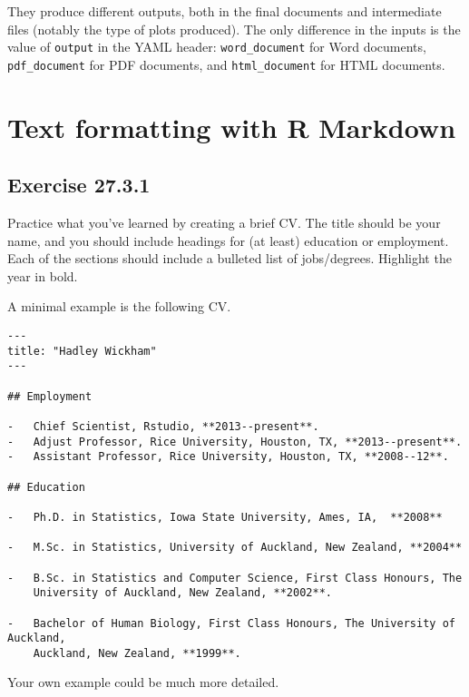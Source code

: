 \documentclass[]{book}
\theoremstyle{plain}
\theoremstyle{remark}
\begin{document}
They produce different outputs, both in the final documents and
intermediate files (notably the type of plots produced). The only
difference in the inputs is the value of \texttt{output} in the YAML
header: \texttt{word\_document} for Word documents,
\texttt{pdf\_document} for PDF documents, and \texttt{html\_document}
for HTML documents.

\hypertarget{text-formatting-with-r-markdown}{%
\section{Text formatting with R
Markdown}\label{text-formatting-with-r-markdown}}

\hypertarget{exercise-27.3.1}{%
\subsection*{\texorpdfstring{Exercise
{27.3.1}}{Exercise 27.3.1}}\label{exercise-27.3.1}}

Practice what you've learned by creating a brief CV. The title should be
your name, and you should include headings for (at least) education or
employment. Each of the sections should include a bulleted list of
jobs/degrees. Highlight the year in bold.

A minimal example is the following CV.

\begin{verbatim}
---
title: "Hadley Wickham"
---

## Employment

-   Chief Scientist, Rstudio, **2013--present**.
-   Adjust Professor, Rice University, Houston, TX, **2013--present**.
-   Assistant Professor, Rice University, Houston, TX, **2008--12**.

## Education

-   Ph.D. in Statistics, Iowa State University, Ames, IA,  **2008**

-   M.Sc. in Statistics, University of Auckland, New Zealand, **2004**

-   B.Sc. in Statistics and Computer Science, First Class Honours, The 
    University of Auckland, New Zealand, **2002**.

-   Bachelor of Human Biology, First Class Honours, The University of Auckland, 
    Auckland, New Zealand, **1999**.
\end{verbatim}

Your own example could be much more detailed.
\end{document}
